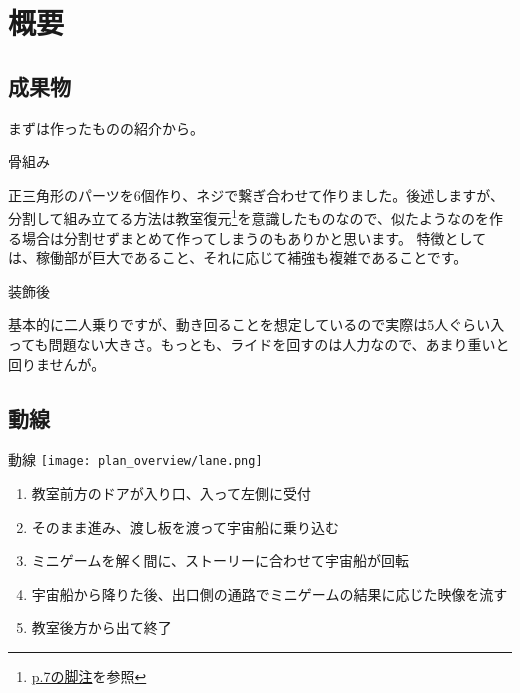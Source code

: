 \documentclass[uplatex,dvipdfmx]{jsreport}
\begin{document}
\section{概要}
\subsection{成果物}

まずは作ったものの紹介から。

\begin{imageHere}{骨組み}
\end{imageHere}

正三角形のパーツを6個作り、ネジで繋ぎ合わせて作りました。後述しますが、分割して組み立てる方法は教室復元\footnote{\hyperlink{note:教室復元}{p.7の脚注}を参照}を意識したものなので、似たようなのを作る場合は分割せずまとめて作ってしまうのもありかと思います。
特徴としては、稼働部が巨大であること、それに応じて補強も複雑であることです。


\begin{imageHere}{装飾後}
    \begin{minipage}{0.45\linewidth}
        \centering
    \end{minipage}\hfill
    \begin{minipage}{0.45\linewidth}
        \centering
    \end{minipage}
\end{imageHere}

基本的に二人乗りですが、動き回ることを想定しているので実際は5人ぐらい入っても問題ない大きさ。もっとも、ライドを回すのは人力なので、あまり重いと回りませんが。

\clearpage

\subsection{動線}

\begin{imageHere}{動線}
    \texttt{[image: plan\_overview/lane.png]}
\end{imageHere}

\begin{enumerate}
    \item 教室前方のドアが入り口、入って左側に受付
    \item そのまま進み、渡し板を渡って宇宙船に乗り込む
    \item ミニゲームを解く間に、ストーリーに合わせて宇宙船が回転
    \item 宇宙船から降りた後、出口側の通路でミニゲームの結果に応じた映像を流す
    \item 教室後方から出て終了
\end{enumerate}
\end{document}
